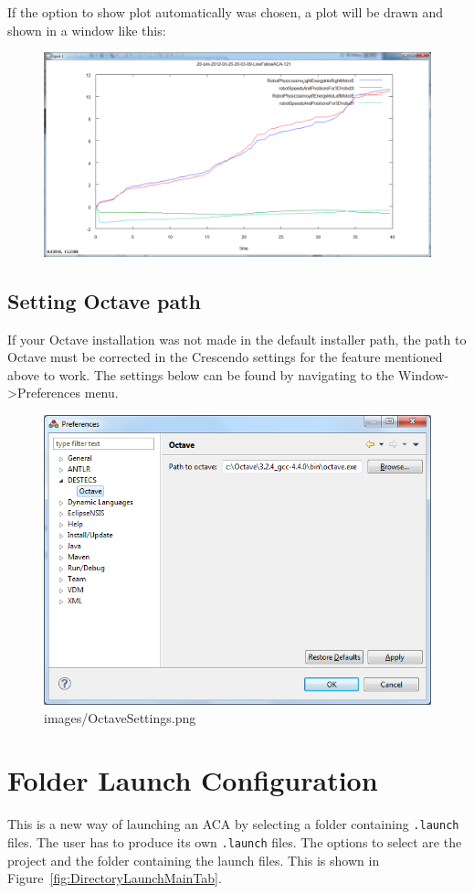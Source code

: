 \documentclass{crescendorepchap}
\begin{document}
If the option to show plot automatically was chosen, a plot will be drawn
and shown in a window like this:

\begin{figure}[htbp]
\centering
\includegraphics[width=.6\textwidth]{images/OctavePlotting.png}
\caption{}
\end{figure}

\subsection{Setting Octave path}

If your Octave installation was not made in the default installer path,
the path to Octave must be corrected in the Crescendo settings for the
feature mentioned above to work. The settings below can be found by
navigating to the Window-\textgreater{}Preferences menu.

\begin{figure}[htbp]
\centering
\includegraphics[width=.6\textwidth]{images/OctaveSettings.png}
\caption{images/OctaveSettings.png}
\end{figure}

\section{Folder Launch Configuration}

This is a new way of launching
an ACA by selecting a folder containing \texttt{.launch} files. The user has to
produce its own \texttt{.launch} files. The options to select are the project
and the folder containing the launch files. This is shown in Figure~\ref{fig:DirectoryLaunchMainTab}.
\end{document}
